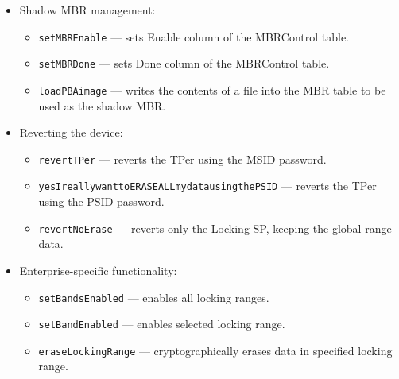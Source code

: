 \begin{itemize}
    \item Shadow MBR management: \begin{itemize}
\item \verb|setMBREnable| --- sets Enable column of the MBRControl table.
\item \verb|setMBRDone| --- sets Done column of the MBRControl table.
\item \verb|loadPBAimage| --- writes the contents of a file into the MBR table to be used as the shadow MBR.
    \end{itemize}
    
    \item Reverting the device: \begin{itemize}
\item \verb|revertTPer| --- reverts the TPer using the MSID password.
\item \verb|yesIreallywanttoERASEALLmydatausingthePSID| --- reverts the TPer using the PSID password.
\item \verb|revertNoErase| --- reverts only the Locking SP, keeping the global range data.
    \end{itemize}
    
    \item Enterprise-specific functionality: \begin{itemize}
\item \verb|setBandsEnabled| --- enables all locking ranges.
\item \verb|setBandEnabled| --- enables selected locking range.
\item \verb|eraseLockingRange| --- cryptographically erases data in specified locking range.
    \end{itemize}
\end{itemize}

